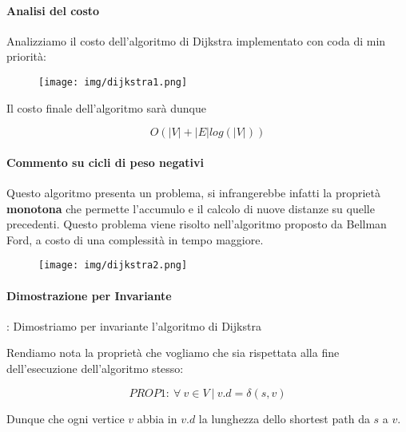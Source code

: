 \documentclass{article}
\begin{document}
\newpage

\paragraph{Analisi del costo} Analizziamo il costo dell'algoritmo di Dijkstra implementato con coda di min priorità:

\begin{figure}[htbp]
        \center
        \texttt{[image: img/dijkstra1.png]}
    \end{figure}

Il costo finale dell'algoritmo sarà dunque

\begin{equation}
    O(|V|+|E|log(|V|))
\end{equation}

\paragraph{Commento su cicli di peso negativi} Questo algoritmo presenta un problema, si infrangerebbe infatti la proprietà \textbf{monotona} che permette l'accumulo e il calcolo di nuove distanze su quelle precedenti. Questo problema viene risolto nell'algoritmo proposto da Bellman Ford, a costo di una complessità in tempo maggiore.

\begin{figure}[htbp]
        \center
        \texttt{[image: img/dijkstra2.png]}
    \end{figure}

\newpage

\paragraph{Dimostrazione per Invariante}: Dimostriamo per invariante l'algoritmo di Dijkstra

Rendiamo nota la proprietà che vogliamo che sia rispettata alla fine dell'esecuzione dell'algoritmo stesso:

\vskip 1cm

\begin{equation}
    PROP1: \: \forall \: v \in V \: | \: v.d = \delta(s,v)
\end{equation}

\vskip 1cm

Dunque che ogni vertice $v$ abbia in $v.d$ la lunghezza dello shortest path da $s$ a $v$.
\end{document}
